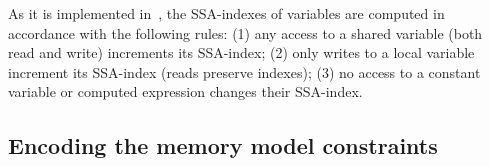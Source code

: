 As it is implemented in~\cite{Porthos17}, the SSA-indexes of variables are computed in accordance with the following rules: (1) any access to a shared variable (both read and write) increments its SSA-index; (2) only writes to a local variable increment its SSA-index (reads preserve indexes); (3) no access to a constant variable or computed expression changes their SSA-index.

\subsection{Encoding the memory model constraints}
\label{ch:port:enc:wmm}

